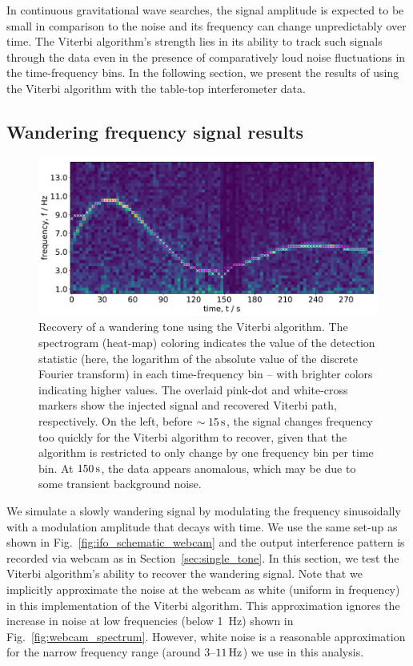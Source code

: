 \documentclass[paper-main.tex]{subfiles}
\begin{document}
In continuous gravitational wave searches, the signal amplitude is expected to be small in comparison to the noise and its frequency can change unpredictably over time.
The Viterbi algorithm's strength lies in its ability to track such signals through the data even in the presence of comparatively loud noise fluctuations in the time-frequency bins.
In the following section, we present the results of using the Viterbi algorithm with the table-top interferometer data. 







\subsection{Wandering frequency signal results}
\label{sec:wanderingResults}

\begin{figure}
	\includegraphics[width=\textwidth]{figures/expt_overlay_2_viterbi_test_webcam.pdf}
	\caption{\label{fig:viterbi_overlay}
Recovery of a wandering tone using the Viterbi algorithm.
The spectrogram (heat-map) coloring indicates the value of the detection statistic (here, the logarithm of the absolute value of the discrete Fourier transform) in each time-frequency bin -- with brighter colors indicating higher values. 
The overlaid pink-dot and white-cross markers show the injected signal and recovered Viterbi path, respectively. 
On the left, before $\sim 15\,{\rm s}$, the signal changes frequency too quickly for the Viterbi algorithm to recover, given that the algorithm is restricted to only change by one frequency bin per time bin. 
At $150\,{\rm s}$, the data appears anomalous, which may be due to some transient background noise. }
\end{figure}
 

We simulate a slowly wandering signal by modulating the frequency sinusoidally with a modulation amplitude that decays with time. 
We use the same set-up as shown in Fig.~\ref{fig:ifo_schematic_webcam} and the output interference pattern is recorded via webcam as in Section~\ref{sec:single_tone}. 
In this section, we test the Viterbi algorithm’s ability to recover the wandering signal. 
Note that we implicitly approximate the noise at the webcam as white (uniform in frequency) in this implementation of the Viterbi algorithm. 
This approximation ignores the increase in noise at low frequencies (below 1~Hz) shown in Fig.~\ref{fig:webcam_spectrum}.
However, white noise is a reasonable approximation for the narrow frequency range (around $3$--$11\,{\rm Hz}$) we use in this analysis. 
\end{document}
